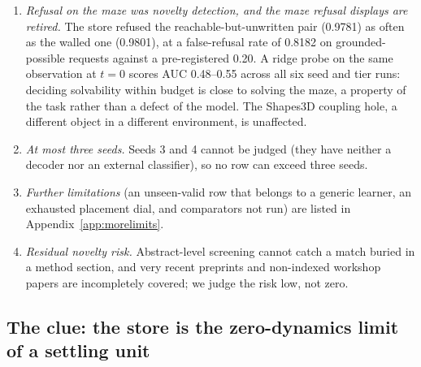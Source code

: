 \documentclass{article} %
\begin{document}
\begin{enumerate}[leftmargin=*,itemsep=1pt]
\item \emph{Refusal on the maze was novelty detection, and the maze refusal displays are
  retired.} The store refused the reachable-but-unwritten pair (0.9781) as often as the walled
  one (0.9801), at a false-refusal rate of 0.8182 on grounded-possible requests against a
  pre-registered 0.20. %
  A ridge probe on the same observation at $t=0$ scores AUC 0.48--0.55 across all six seed and
  tier runs: deciding solvability within budget is close to solving the maze, a property of the task rather than a defect of the model. %
  The Shapes3D coupling hole, a different object in a different environment, is unaffected.
\item \emph{At most three seeds.} Seeds 3 and 4 cannot be judged (they have neither a decoder
  nor an external classifier), so no row can exceed three seeds.
\item \emph{Further limitations} (an unseen-valid row that belongs to a generic learner, an
  exhausted placement dial, and comparators not run) are listed in Appendix~\ref{app:morelimits}.
\item \emph{Residual novelty risk.} Abstract-level screening cannot catch a match buried in a
  method section, and very recent preprints and non-indexed workshop papers are incompletely covered; we judge the risk low, not zero. %
\end{enumerate}

\subsection{The clue: the store is the zero-dynamics limit of a settling unit}
\label{sec:clue}
\end{document}
